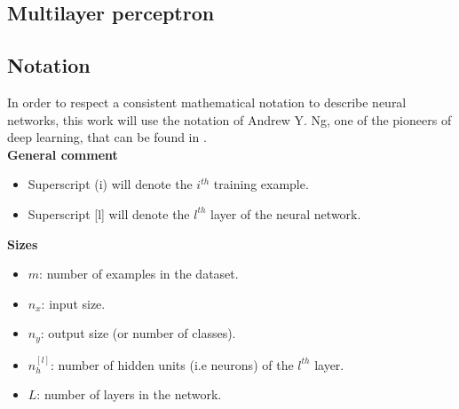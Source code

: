 \subsection{Multilayer perceptron}

\subsection{Notation}
In order to respect a consistent mathematical notation to describe neural networks, this work will use the notation of Andrew Y. Ng, one of the pioneers of deep learning, that can be found in \cite{16}.\\

\noindent \textbf{General comment}
\begin{itemize}
\item Superscript (i) will denote the $i^{th}$ training example.
\item Superscript [l] will denote the $l^{th}$ layer of the neural network.
\end{itemize}

\noindent \textbf{Sizes}
\begin{itemize}
\item $m$: number of examples in the dataset.
\item $n_{x}$: input size.
\item $n_{y}$: output size (or number of classes).
\item $n_{h}^{[l]}$: number of hidden units (i.e neurons) of the $l^{th}$ layer. 
\item $L$: number of layers in the network.
\end{itemize}

